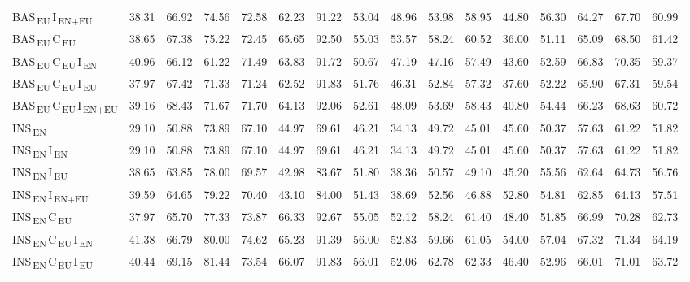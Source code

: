 \begin{tabular}{lrrrrrrrrrrrrrrr}
BAS\textsubscript{\,EU}\,I\textsubscript{\,EN+EU} & 38.31 & 66.92 & 74.56 & 72.58 & 62.23 & 91.22 & 53.04 & 48.96 & 53.98 & 58.95 & 44.80 & 56.30 & 64.27 & 67.70 & 60.99 \\
BAS\textsubscript{\,EU}\,C\textsubscript{\,EU} & 38.65 & 67.38 & 75.22 & 72.45 & 65.65 & 92.50 & 55.03 & 53.57 & 58.24 & 60.52 & 36.00 & 51.11 & 65.09 & 68.50 & 61.42 \\
BAS\textsubscript{\,EU}\,C\textsubscript{\,EU}\,I\textsubscript{\,EN} & 40.96 & 66.12 & 61.22 & 71.49 & 63.83 & 91.72 & 50.67 & 47.19 & 47.16 & 57.49 & 43.60 & 52.59 & 66.83 & 70.35 & 59.37 \\
BAS\textsubscript{\,EU}\,C\textsubscript{\,EU}\,I\textsubscript{\,EU} & 37.97 & 67.42 & 71.33 & 71.24 & 62.52 & 91.83 & 51.76 & 46.31 & 52.84 & 57.32 & 37.60 & 52.22 & 65.90 & 67.31 & 59.54 \\
BAS\textsubscript{\,EU}\,C\textsubscript{\,EU}\,I\textsubscript{\,EN+EU} & 39.16 & 68.43 & 71.67 & 71.70 & 64.13 & 92.06 & 52.61 & 48.09 & 53.69 & 58.43 & 40.80 & 54.44 & 66.23 & 68.63 & 60.72 \\
INS\textsubscript{\,EN} & 29.10 & 50.88 & 73.89 & 67.10 & 44.97 & 69.61 & 46.21 & 34.13 & 49.72 & 45.01 & 45.60 & 50.37 & 57.63 & 61.22 & 51.82 \\
INS\textsubscript{\,EN}\,I\textsubscript{\,EN} & 29.10 & 50.88 & 73.89 & 67.10 & 44.97 & 69.61 & 46.21 & 34.13 & 49.72 & 45.01 & 45.60 & 50.37 & 57.63 & 61.22 & 51.82 \\
INS\textsubscript{\,EN}\,I\textsubscript{\,EU} & 38.65 & 63.85 & 78.00 & 69.57 & 42.98 & 83.67 & 51.80 & 38.36 & 50.57 & 49.10 & 45.20 & 55.56 & 62.64 & 64.73 & 56.76 \\
INS\textsubscript{\,EN}\,I\textsubscript{\,EN+EU} & 39.59 & 64.65 & 79.22 & 70.40 & 43.10 & 84.00 & 51.43 & 38.69 & 52.56 & 46.88 & 52.80 & 54.81 & 62.85 & 64.13 & 57.51 \\
INS\textsubscript{\,EN}\,C\textsubscript{\,EU} & 37.97 & 65.70 & 77.33 & 73.87 & 66.33 & 92.67 & 55.05 & 52.12 & 58.24 & 61.40 & 48.40 & 51.85 & 66.99 & 70.28 & 62.73 \\
INS\textsubscript{\,EN}\,C\textsubscript{\,EU}\,I\textsubscript{\,EN} & 41.38 & 66.79 & 80.00 & 74.62 & 65.23 & 91.39 & 56.00 & 52.83 & 59.66 & 61.05 & 54.00 & 57.04 & 67.32 & 71.34 & 64.19 \\
INS\textsubscript{\,EN}\,C\textsubscript{\,EU}\,I\textsubscript{\,EU} & 40.44 & 69.15 & 81.44 & 73.54 & 66.07 & 91.83 & 56.01 & 52.06 & 62.78 & 62.33 & 46.40 & 52.96 & 66.01 & 71.01 & 63.72 \\

\end{tabular}
